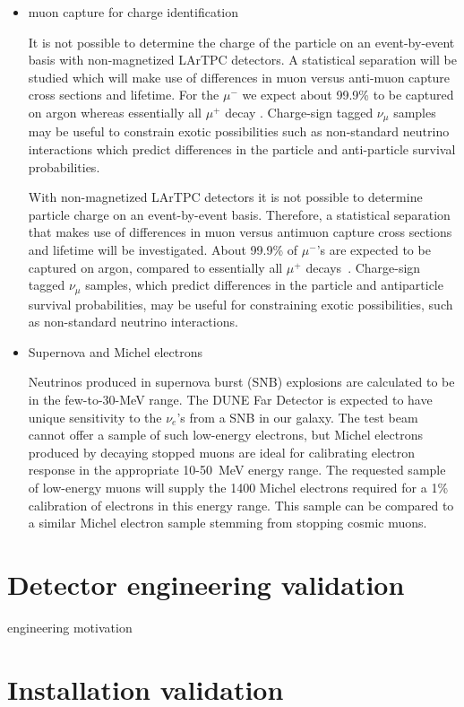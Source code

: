 \begin{itemize}
\item muon capture for charge identification

It is not possible to determine the charge of the particle on an event-by-event basis with non-magnetized LArTPC detectors. A statistical separation will be studied which will make use of differences in muon versus anti-muon capture cross sections and lifetime.
For the $\mu^-$ we expect about 99.9\% to be captured on argon whereas essentially all $\mu^+$ decay \cite{stopmu}.
Charge-sign tagged $\nu_\mu$ samples may be useful to constrain exotic possibilities such as
non-standard neutrino interactions which predict differences in the particle and anti-particle survival probabilities. 

With non-magnetized LArTPC detectors it is not possible to determine particle charge on an event-by-event basis. Therefore, a statistical separation that makes use of differences in muon versus antimuon capture cross sections and lifetime will be investigated.
About 99.9\% of $\mu^-$'s are expected to be captured on argon, compared to essentially all $\mu^+$ decays~\cite{stopmu}.
Charge-sign tagged $\nu_\mu$ samples, which predict differences in the particle and antiparticle survival probabilities, may be useful for constraining exotic possibilities, such as non-standard neutrino interactions. 


\item Supernova and Michel electrons

Neutrinos produced in supernova burst (SNB) explosions are calculated to be in the few-to-30-MeV range.
The DUNE Far Detector is expected to have unique sensitivity to the $\nu_e$'s from a SNB in our galaxy.
%
The test beam cannot offer a sample of  such low-energy electrons, but Michel electrons  produced by 
decaying stopped muons are ideal for calibrating electron response in the appropriate 10-50~MeV energy range. 
The requested   sample of low-energy muons will supply the 1400 Michel electrons required for a 1\% 
calibration of electrons in this energy range. This sample can be compared to a similar Michel electron sample
stemming from stopping cosmic muons.

\end{itemize}



\section{Detector engineering validation}
engineering motivation

\section{Installation validation}




